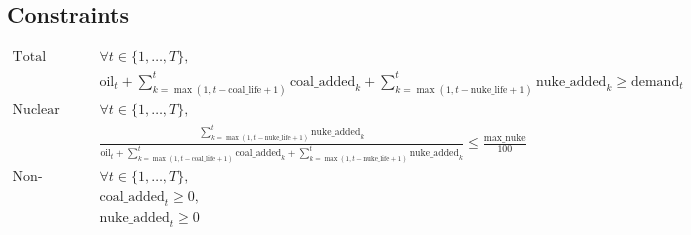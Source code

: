\documentclass{article}
\begin{document}
\subsection*{Constraints}
\begin{align*}
    \text{Total capacity constraint: } & \forall t \in \{1, \dots, T\}, \\
    & \text{oil}_t + \sum_{k=\max(1, t-\text{coal\_life}+1)}^{t} \text{coal\_added}_k + \sum_{k=\max(1, t-\text{nuke\_life}+1)}^{t} \text{nuke\_added}_k \geq \text{demand}_t \\
    \text{Nuclear capacity constraint: } & \forall t \in \{1, \dots, T\}, \\
    & \frac{\sum_{k=\max(1, t-\text{nuke\_life}+1)}^{t} \text{nuke\_added}_k}{\text{oil}_t + \sum_{k=\max(1, t-\text{coal\_life}+1)}^{t} \text{coal\_added}_k + \sum_{k=\max(1, t-\text{nuke\_life}+1)}^{t} \text{nuke\_added}_k} \leq \frac{\text{max\_nuke}}{100} \\
    \text{Non-negativity constraints: } & \forall t \in \{1, \dots, T\}, \\
    & \text{coal\_added}_t \geq 0, \\
    & \text{nuke\_added}_t \geq 0
\end{align*}
\end{document}
